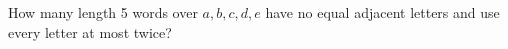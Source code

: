 How many length 5 words over $a,b,c,d,e$ have no equal adjacent letters and use every letter at most twice?
